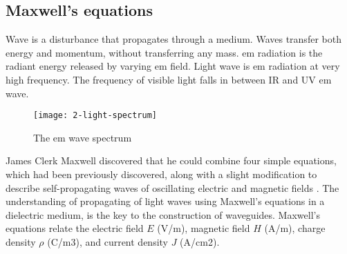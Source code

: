 \documentclass[../report.tex]{subfiles}
\begin{document}
		\subsection{Maxwell's equations}
Wave is a disturbance that propagates through a medium. Waves transfer both energy and momentum, without transferring any mass. \gls{em} radiation is the radiant energy released by varying \gls{em} field. Light wave is \gls{em} radiation at very high frequency. The frequency of visible light falls in between IR and UV \gls{em} wave.
\begin{figure}[h]
	\centering
	\texttt{[image: 2-light-spectrum]}
	\caption{The \gls{em} wave spectrum}
	\label{fig:2_light_spectrum}
\end{figure}
James Clerk Maxwell discovered that he could combine four simple equations, which had been previously discovered, along with a slight modification to describe self-propagating waves of oscillating electric and magnetic fields \cite{waveparticle_2016}. The understanding of propagating of light waves using Maxwell's equations in a dielectric medium, is the key to the construction of waveguides. Maxwell’s equations relate the electric field $E$ (V/m), magnetic field $H$ (A/m), charge density $\rho$ (C/m3), and current density $J$ (A/cm2).
\end{document}
